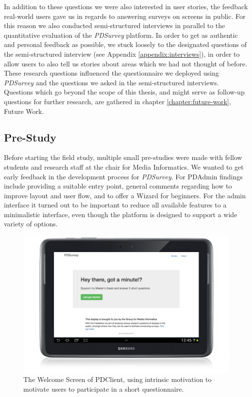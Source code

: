 	In addition to these questions we were also interested in user stories, the feedback real-world users gave us in regards to answering surveys on screens in public. For this reason we also conducted semi-structured interviews in parallel to the quantitative evaluation of the \textit{PDSurvey} platform. In order to get as authentic and personal feedback as possible, we stuck loosely to the designated questions of the semi-structured interview (see Appendix \ref{appendix:interviews}), in order to allow users to also tell us stories about areas which we had not thought of before.
	These research questions influenced the questionnaire we deployed using \textit{PDSurvey} and the questions we asked in the semi-structured interviews. Questions which go beyond the scope of this thesis, and might serve as follow-up questions for further research, are gathered in chapter \ref{chapter:future-work}, Future Work.




\subsection{Pre-Study}

	Before starting the field study, multiple small pre-studies were made with fellow students and research staff at the chair for Media Informatics. We wanted to get early feedback in the development process for \textit{PDSurvey}. 
	For PDAdmin findings include providing a suitable entry point, general comments regarding how to improve layout and user flow, and to offer a Wizard for beginners. For the admin interface it turned out to be important to reduce all available features to a minimalistic interface, even though the platform is designed to support a wide variety of options. 

	\begin{figure}
	    \begin{center}
	        \includegraphics[width=.7\columnwidth]{img/5_field-study/pdclient-startscreen.png}
	    \end{center}
	 \caption{The Welcome Screen of PDClient, using intrinsic motivation to motivate users to participate in a short questionnaire.}
	 \label{fig:5-pdclient-intro}
	\end{figure}

